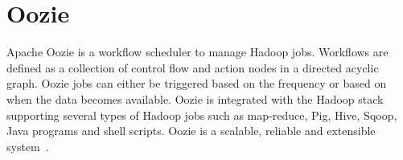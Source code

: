 \section{Oozie}
Apache Oozie is a workflow scheduler to manage Hadoop jobs. Workflows are defined as a 
collection of control flow and action nodes in a directed acyclic graph. Oozie  jobs 
can either be triggered based on the frequency or based on when the data becomes 
available. Oozie is integrated with the Hadoop stack supporting several types of 
Hadoop jobs such as map-reduce, Pig, Hive, Sqoop, Java programs and shell scripts. 
Oozie is a scalable, reliable and extensible system~\cite{oozie}.

